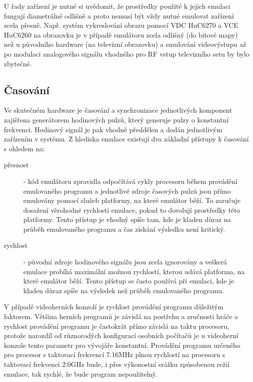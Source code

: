U řady zařízení je nutné si uvědomit, že prostředky použité k jejich emulaci
fungují diametrálně odlišně a proto nemusí být vždy nutné emulovat zařízení
zcela přesně. Např. systém vykreslování obrazu pomocí VDC HuC6270 a VCE HuC6260
na obrazovku je v případě emulátoru zcela odlišný (do bitové mapy) než u
původního hardware (na televizní obrazovku) a emulování videovýstupu až po
modulaci analogového signálu vhodného pro RF vstup televizního setu by bylo
zbytečné.



\subsection{Časování}

Ve skutečném hardware je časování a synchronizace jednotlivých komponent
zajišťena generátorem hodinových pulzů, který generuje pulzy o konstantní
frekvenci. Hodinový signál je pak vhodně předdělen a dodán jednotlivým
zařízením v systému. Z hlediska emulace existují dva základní přístupy k
časování s ohledem na:

\begin{description}
\item[přesnost] - kód emulátoru zpravidla odpočítává cykly procesoru během
	provádění emulovaného programu a jednotlivé zdroje časových pulzů jsou
	přímo emulovány pomocí služeb platformy, na které emulátor běží. To
	zaručuje dosažení věrohodné rychlosti emulace, pokud to dovolují prostředky
	této platformy. Tento přístup je vhodný spíše tam, kde je kladen důraz na
	průběh emulovaného programu a čas získání výsledku není kritický.

\item[rychlost] - původní zdroje hodinového signálu jsou zcela ignorovány a
	veškerá emulace probíhá maximální možnou rychlostí, kterou udává platforma,
	na které emulátor běží. Tento přístup se často používá při emulaci, kde je
	kladen důraz spíše na výsledek než průběh emulovaného programu.
\end{description}

V případě videoherních konzolí je rychlost provádění programu důležitým
faktorem. Většina herních programů je závislá na postřehu a zručnosti hráče a
rychlost provádění programu je častokrát přímo závislá na taktu procesoru,
protože narozdíl od různorodých konfigurací osobních počítačů je u videoherní
konzole tento parametr pro vývojáře konstantní. Provádění programu určeného pro
procesor s taktovací frekvencí 7.16MHz plnou rychlostí na procesoru s taktovací
frekvencí 2.0GHz bude, i přes výkonostní srážku způsobenou režií emulace, tak
rychlé, že bude program nepoužitelný.

